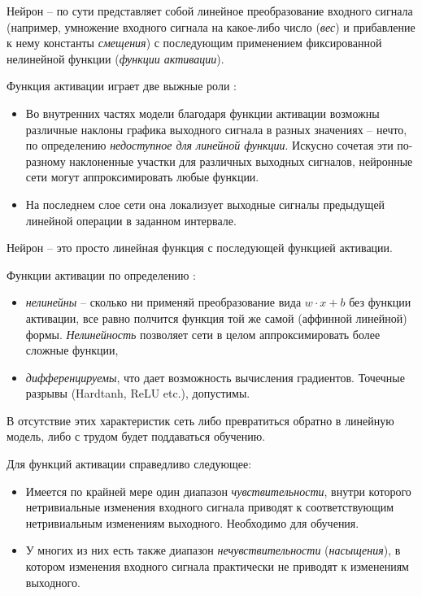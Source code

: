 \documentclass[%
	11pt,
	a4paper,
	utf8,
		]{article}
\begin{document}
Нейрон -- по сути представляет собой линейное преобразование входного сигнала (например, умножение входного сигнала на какое-либо число (\emph{вес}) и прибавление к нему константы \emph{смещения}) с последующим применением фиксированной нелинейной функции (\emph{функции активации}).

Функция активации играет две выжные роли \cite[]{pytorch-2022}:
\begin{itemize}
	\item Во внутренних частях модели благодаря функции активации возможны различные наклоны графика выходного сигнала в разных значениях -- нечто, по определению \emph{недоступное для линейной функции}. Искусно сочетая эти по-разному наклоненные участки для различных выходных сигналов, нейронные сети могут аппроксимировать любые функции.
	
	\item На последнем слое сети она локализует выходные сигналы предыдущей линейной операции в заданном интервале.
\end{itemize}

Нейрон -- это просто линейная функция с последующей функцией активации. 

Функции активации по определению \cite[]{pytorch-2022}:
\begin{itemize}
	\item \emph{нелинейны} -- сколько ни применяй преобразование вида $w \cdot x + b$ без функции активации, все равно полчится функция той же самой (аффинной линейной) формы. {\color{blue}\emph{Нелинейность} позволяет сети в целом аппроксимировать более сложные функции},
	
	\item \emph{дифференцируемы}, что дает возможность вычисления градиентов. Точечные разрывы (Hardtanh, ReLU etc.), допустимы.
\end{itemize}

В отсутствие этих характеристик сеть либо превратиться обратно в линейную модель, либо с трудом будет поддаваться обучению.

Для функций активации справедливо следующее:
\begin{itemize}
	\item Имеется по крайней мере один диапазон \emph{чувствительности}, внутри которого нетривиальные изменения входного сигнала приводят к соответствующим нетривиальным изменениям выходного. Необходимо для обучения.
	
	\item У многих из них есть также диапазон \emph{нечувствительности} (\emph{насыщения}), в котором изменения входного сигнала практически не приводят к изменениям выходного.
\end{itemize}
\end{document}

